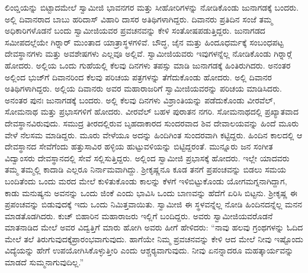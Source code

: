  ಲಿಂಬ್ಡಿಯನ್ನು ಬಿಟ್ಟಾದಮೇಲೆ ಸ್ವಾಮೀಜಿ ಭಾವನಗರ ಮತ್ತು ಸೀಹೋರಿಗಳನ್ನು ನೋಡಿಕೊಂಡು ಜುನಾಗಡಕ್ಕೆ ಬಂದರು. ಅಲ್ಲಿ ದಿವಾನರಾದ ಬಾಬು ಹರಿದಾಸ್ ವಿಹಾರಿ ದಾಸರ ಅತಿಥಿಗಳಾಗಿದ್ದರು. ದಿವಾನರು ಪ್ರತಿದಿನ ಸಂಜೆ ತಮ್ಮ ಅಧಿಕಾರಿಗಳೊಡನೆ ಬಂದು ಸ್ವಾಮೀಜಿಯವರ ಪ್ರವಚನವನ್ನು ಕೇಳಿ ಸಂತೋಷಪಡುತ್ತಿದ್ದರು. ಜುನಾಗಡದ ಸಮೀಪದಲ್ಲೆಯೇ ಗಿರ‍್ನಾರ್ ಮುಂತಾದ ಯಾತ್ರಾಸ್ಥಳಗಳಿವೆ. ಬೌದ್ಧ, ಜೈನ ಮತ್ತು ಹಿಂದೂಧರ್ಮಕ್ಕೆ ಸಂಬಂಧಪಟ್ಟ ದೇವಸ್ಥಾನಗಳು ಮತ್ತು ಅವಶೇಷಗಳು ಎಲ್ಲವೂ ಅಲ್ಲಿವೆ. ಸ್ವಾಮೀಜಿಯವರು ಇವುಗಳನ್ನೆಲ್ಲ ನೋಡಿಕೊಂಡು ಗಿರ‍್ನಾರ್‍ಗೆ ಹೋದರು. ಅಲ್ಲಿಯ ಒಂದು ಗುಹೆಯಲ್ಲಿ ಕೆಲವು ದಿನಗಳು ತಪಸ್ಸು ಮಾಡಿ ಜುನಾಗಡಕ್ಕೆ ಹಿಂತಿರುಗಿದರು. ಅನಂತರ ಅಲ್ಲಿಂದ ಭುಜ್‍ಗೆ ದಿವಾನರಿಂದ ಕೆಲವು ಪರಿಚಯ ಪತ್ರಗಳನ್ನು ತೆಗೆದುಕೊಂಡು ಹೋದರು. ಅಲ್ಲಿ ದಿವಾನರ ಅತಿಥಿಗಳಾಗಿದ್ದರು. ಅಲ್ಲಿಯ ದಿವಾನರು ಅವರ ಮಹಾರಾಜರಿಗೆ ಸ್ವಾಮೀಜಿಯವರನ್ನು ಪರಿಚಯ ಮಾಡಿಸಿದರು. ಅನಂತರ ಪುನಃ ಜುನಾಗಡಕ್ಕೆ ಬಂದರು. ಅಲ್ಲಿ ಕೆಲವು ದಿನಗಳು ವಿಶ್ರಾಂತಿಯನ್ನು ಪಡೆದುಕೊಂಡು ವೀರವೆಲ್, ಸೋಮನಾಥ ಮತ್ತು ಪ್ರಭಾಸಗಳಿಗೆ ಹೋದರು. ವೀರವೆಲ್ ಬಹಳ ಪುರಾತನ ನಗರಿ. ಸೋಮನಾಥದಲ್ಲಿ ಪ್ರಖ್ಯಾತವಾದ ದೇವಸ್ಥಾನವಿರುವುದು. ಸಮುದ್ರ ತೀರದಲ್ಲಿರುವ ಬೃಹದಾಕಾರದ ಸುಂದರವಾದ ಶಿವ ದೇವಾಲಯವನ್ನು ಹಿಂದೆ ಮೂರು ವೇಳೆ ನೆಲಸಮ ಮಾಡಿದ್ದರು. ಮೂರು ವೇಳೆಯೂ ಅದನ್ನು ಹಿಂದಿಗಿಂತ ಸುಂದರವಾಗಿ ಕಟ್ಟಿದ್ದರು. ಹಿಂದಿನ ಕಾಲದಲ್ಲಿ ಆ ದೇವಸ್ಥಾನದ ಸೇವೆಗೆಂದು ಹತ್ತುಸಾವಿರ ಹಳ್ಳಿಯ ಹುಟ್ಟುವಳಿಯನ್ನು ಬಿಟ್ಟಿದ್ದರಂತೆ. ಮುನ್ನೂರು ಜನ ಸಂಗೀತ ವಿದ್ವಾಂಸರು ದೇವಸ್ಥಾನದಲ್ಲಿ ಸೇವೆ ಸಲ್ಲಿಸುತ್ತಿದ್ದರು. ಅಲ್ಲಿಂದ ಸ್ವಾಮೀಜಿ ಪ್ರಭಾಸಕ್ಕೆ ಹೋದರು. ಇಲ್ಲೇ ಯಾದವರು ತಮ್ಮ ತಮ್ಮಲ್ಲಿ ಕಾದಾಡಿ ಎಲ್ಲರೂ ನಿರ್ನಾಮವಾಗಿದ್ದು. ಶ‍್ರೀಕೃಷ್ಣನೂ ಕೂಡ ತನಗೆ ಪ್ರಪಂಚವನ್ನು ಬಿಡಲು ಸಮಯ ಬಂದಿತೆಂದು ಒಂದು ಮರದ ಮೇಲೆ ಕುಳಿತುಕೊಂಡು ಕಾಲನ್ನು ಕೆಳಗೆ ಇಳಿಬಿಟ್ಟುಕೊಂಡು ಯೋಗಮಗ್ನನಾಗಿದ್ದಾಗ, ಕಾಡು ಮನುಷ್ಯನು ಅವನನ್ನು ಒಂದು ಜಿಂಕೆ ಎಂದು ಭಾವಿಸಿ ಒಂದು ಬಾಣವನ್ನು ಹೆದೆಗೆ ಏರಿಸಿ ಬಿಟ್ಟನು. ಶ‍್ರೀಕೃಷ್ಣ ಈ ಪ್ರಪಂಚವನ್ನು ಬಿಡುವುದಕ್ಕೆ ಇದು ಒಂದು ನಿಮಿತ್ತವಾಯಿತು. ಸ್ವಾಮೀಜಿ ಈ ಸ್ಥಳವನ್ನೆಲ್ಲ ನೋಡಿ ಹಿಂದಿನದನ್ನೆಲ್ಲ ಮನನ ಮಾಡತೊಡಗಿದರು. ಕುಚ್ ಬಿಹಾರಿನ ಮಹಾರಾಜರು ಇಲ್ಲಿಗೆ ಬಂದಿದ್ದರು. ಅವರು ಸ್ವಾಮೀಜಿಯವರೊಡನೆ ಮಾತನಾಡಿದ ಮೇಲೆ ಅವರ ವಿದ್ವತ್ತಿಗೆ ಮಾರು ಹೋಗಿ ಅವರು ಹೀಗೆ ಹೇಳಿದರು: “ನಾವು ಹಲವು ಗ್ರಂಥಗಳನ್ನು ಓದಿದ ಮೇಲೆ ತಲೆ ತಿರುಗುವುದಕ್ಕೆ\break ಪ್ರಾರಂಭವಾಗುವುದು. ಹಾಗೆಯೇ ನಿಮ್ಮ ಪ್ರವಚನವನ್ನು ಕೇಳಿ ಆದ ಮೇಲೆ ನೀವು ಇಷ್ಟೊಂದು ವಿದ್ಯೆಯನ್ನು ಹೇಗೆ ಉಪಯೋಗಿಸಿಕೊಳ್ಳುತ್ತೀರಿ ಎಂದು ಆಶ್ಚರ‍್ಯವಾಗುವುದು. ನೀವು ಏನನ್ನಾದರೂ ಮಹತ್ಕಾರ್ಯವನ್ನು ಮಾಡದೆ ಸುಮ್ಮನಾಗುವುದಿಲ್ಲ.”

